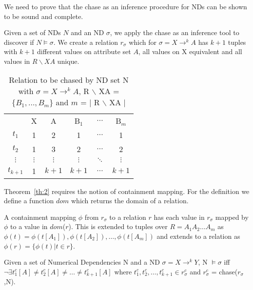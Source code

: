 We need to prove that the chase as an inference procedure for NDs can be shown
to be sound and complete. 

Given a set of NDs $N$ and an ND $\sigma$, we apply the chase as an
inference tool to discover if $N \models \sigma$. 
We create a relation $r_\sigma$ which for $\sigma = X \to^k
A$ has $k+1$ tuples with $k+1$ different values on attribute set $A$,
all values on X equivalent and all values in $R \backslash XA$ unique.

{\line
\begin{table}[ht]
\begin{center}
\begin{tabular}{c|c|c|c|c|c|} \cline{2-6}
 	& X 	& A 	& B$_1$ & $\ldots$ 	& B$_m$ \\ \cline{2-6}
$t_1$ 	& 1  	&  2  	& 1 	& $\ldots$ 	& 1 \\
$t_2$ 	& 1  	&  3  	& 2 	&  $\ldots$ 	& 2 \\
$\vdots$ & $\vdots$  &  $\vdots$  & $\vdots$ & $\ddots$ & $\vdots$ \\
$t_{k+1}$ & 1  &  $k+1$  & $k+1$ & $\ldots$ 	& $k+1$ \\ \cline{2-6}
\end{tabular}
\end{center}
\caption{\label{tbl:1.0} Relation to be chased by ND set N with
$\sigma = X \to^k A$, R $\backslash$ XA = $\{ B_1, \ldots, B_m \}$
and $m$ = $|$ R $\backslash$ XA $|$}
\end{table}}

Theorem~\ref{th:2} requires the notion of containment mapping.
For the definition we define a function $dom$ which returns the domain
of a relation.

\begin{definition}\label{def:cm}
\begin{rm}
A containment mapping $\phi$ from $r_\sigma$ to a relation $r$ has
each value in $r_\sigma$ mapped by $\phi$ to a value in $dom$($r$).
This is extended to tuples over $R = A_1A_2 \ldots A_m$ as $\phi(t) =
\phi(t[A_1]),\phi(t[A_2]),\ldots, \phi(t[A_m])$ and extends to a
relation as $\phi(r) = \{ \phi(t) | t \in r \}$.
\end{rm}
\end{definition}

\begin{theorem}\label{th:2}
\begin{rm}
Given a set of Numerical Dependencies N and a ND $\sigma = X \to^k Y$,
N $\models \sigma$ iff $\neg\exists t^c_1[A] \not= t^c_2[A] \not= \ldots
\not= t^c_{k+1}[A]$ where $t^c_1,t^c_2,\ldots,t^c_{k+1} \in
r_\sigma^c$ and $r_\sigma^c$ = chase($r_\sigma$,N).
\end{rm}
\end{theorem}

